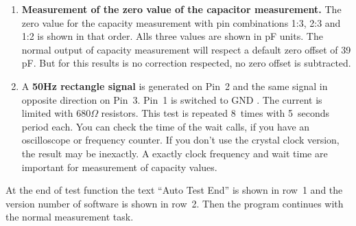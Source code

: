 \begin{enumerate}
\item {\bf Measurement of the zero value of the capacitor measurement.}
The zero value for the capacity measurement with pin combinations 1:3, 2:3 and 1:2 is shown in that order.
Alls three values are shown in pF units.
The normal output of capacity measurement will respect a default zero offset of 39 pF.
But for this results is no correction respected, no zero offset is subtracted.

\item A {\bf 50Hz rectangle signal} is generated on Pin~2 and  the same signal in opposite direction on Pin~3.
Pin~1 is switched to GND . The current is limited with \(680\Omega\) resistors.
This test is repeated 8~times with 5~seconds period each.
You can check the time of the wait calls, if you have an oscilloscope or frequency counter.
If you don't use the crystal clock version, the result may be inexactly.
A exactly clock frequency and wait time are important for measurement of capacity values.

\end{enumerate}

At the end of test function the text ``Auto Test End''  is shown in row~1 and the version number of software is shown in row~2.
Then the program continues with the normal measurement task.

